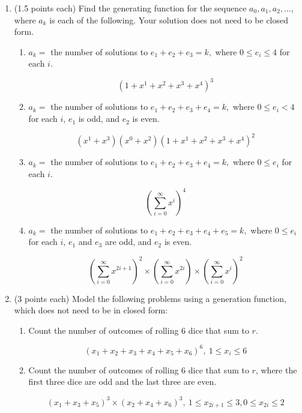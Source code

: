 \documentclass[11pt]{article}
\begin{document}
\begin{enumerate}


\item (1.5 points each) Find the generating function for the sequence
$a_0, a_1, a_2, \ldots$, where $a_k$ is each of the following.
Your solution does not need to be closed form.
	\begin{enumerate}
		\item $a_k = $ the number of solutions to $e_1 + e_2 + e_3 = k,$
		where $0 \leq e_i \leq 4$ for each $i$.
		
			\[ (1 + x^1 + x^2 + x^3 + x^4)^3 \]
		
		\item $a_k = $ the number of solutions to $e_1 + e_2 + e_3 + e_4 = k,$
		where $0 \leq e_i < 4$ for each $i$, $e_1$ is odd, and $e_2$ is even.
		
			\[ (x^1 + x^3)(x^0 + x^2)(1 + x^1 + x^2 + x^3 + x^4)^2 \]
		
		\item $a_k = $ the number of solutions to $e_1 + e_2 + e_3 + e_4 = k,$
		where $0 \leq e_i$ for each $i$.
		
			\[ \left(\sum_{i = 0}^{\infty} x^i \right)^4 \]
		
		\item $a_k = $ the number of solutions to $e_1 + e_2 + e_3 + e_4 + e_5= k,$
		where $0 \leq e_i$ for each $i$, $e_1$ and $e_3$ are odd, and $e_2$
		is even.
		
			\[ \left(\sum_{i = 0}^{\infty} x^{2i + 1} \right)^2 \times \left(\sum_{i = 0}^{\infty} x^{2i} \right) \times \left(\sum_{i = 0}^{\infty} x^{i} \right)^2 \]
		
	\end{enumerate}

\item (3 points each) Model the following problems using a generation function,
which does not need to be in closed form:  
\begin{enumerate}
	\item Count the number of outcomes of
	rolling $6$ dice that sum to $r$.
	
	\[ (x_1 + x_2 + x_3 + x_4 + x_5 + x_6)^6, \: 1 \le x_i \le 6\]
	
	\item Count the number of outcomes of rolling $6$ dice that sum to $r$,
	where the first three dice are odd and the last three are even.
	
	\[ (x_1 + x_3 + x_5)^3 \times (x_2 + x_4 + x_6)^3, \: 1 \le x_{2i + 1} \le 3, 0 \le x_{2i} \le 2 \]	
	

\end{enumerate}
\end{enumerate}
\end{document}
